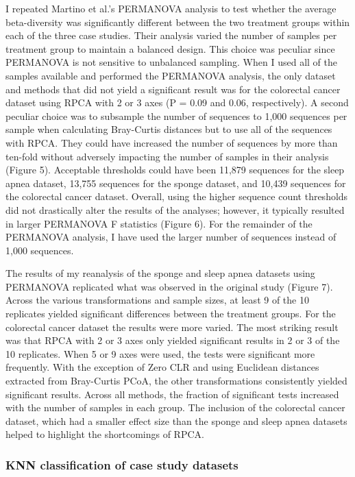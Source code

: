 \documentclass[
  11pt,
]{article}
\begin{document}
I repeated Martino et al.'s PERMANOVA analysis to test whether the
average beta-diversity was significantly different between the two
treatment groups within each of the three case studies. Their analysis
varied the number of samples per treatment group to maintain a balanced
design. This choice was peculiar since PERMANOVA is not sensitive to
unbalanced sampling. When I used all of the samples available and
performed the PERMANOVA analysis, the only dataset and methods that did
not yield a significant result was for the colorectal cancer dataset
using RPCA with 2 or 3 axes (P = 0.09 and 0.06, respectively). A second
peculiar choice was to subsample the number of sequences to 1,000
sequences per sample when calculating Bray-Curtis distances but to use
all of the sequences with RPCA. They could have increased the number of
sequences by more than ten-fold without adversely impacting the number
of samples in their analysis (Figure 5). Acceptable thresholds could
have been 11,879 sequences for the sleep apnea dataset, 13,755 sequences
for the sponge dataset, and 10,439 sequences for the colorectal cancer
dataset. Overall, using the higher sequence count thresholds did not
drastically alter the results of the analyses; however, it typically
resulted in larger PERMANOVA F statistics (Figure 6). For the remainder
of the PERMANOVA analysis, I have used the larger number of sequences
instead of 1,000 sequences.

The results of my reanalysis of the sponge and sleep apnea datasets
using PERMANOVA replicated what was observed in the original study
(Figure 7). Across the various transformations and sample sizes, at
least 9 of the 10 replicates yielded significant differences between the
treatment groups. For the colorectal cancer dataset the results were
more varied. The most striking result was that RPCA with 2 or 3 axes
only yielded significant results in 2 or 3 of the 10 replicates. When 5
or 9 axes were used, the tests were significant more frequently. With
the exception of Zero CLR and using Euclidean distances extracted from
Bray-Curtis PCoA, the other transformations consistently yielded
significant results. Across all methods, the fraction of significant
tests increased with the number of samples in each group. The inclusion
of the colorectal cancer dataset, which had a smaller effect size than
the sponge and sleep apnea datasets helped to highlight the shortcomings
of RPCA.

\subsubsection{KNN classification of case study
datasets}\label{knn-classification-of-case-study-datasets}
\end{document}
